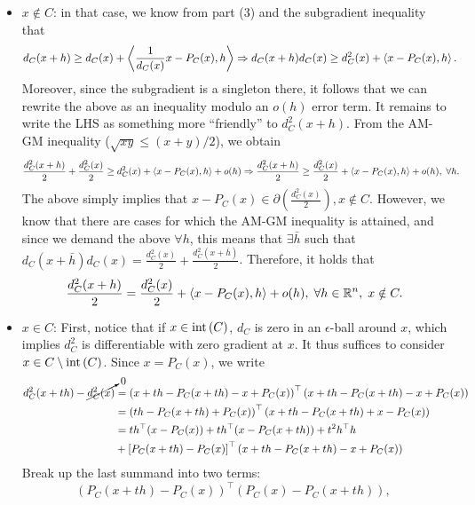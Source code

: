 \documentclass[10pt]{article}
\begin{document}
\begin{itemize}
\item $x \notin C$: in that case, we know from part (3) and the subgradient
inequality that
\begin{align*}
    d_C(x + h) &\geq d_C(x) + \left\langle \frac{1}{d_C(x)} x - P_C(x), h \right\rangle \Rightarrow
    d_C(x + h) d_C(x) \geq d^2_C(x) + \left\langle x - P_C(x), h \right\rangle.
\end{align*}
Moreover, since the subgradient is a singleton there, it follows that we
can rewrite the above as an inequality modulo an $o(h)$ error term.
It remains to write the LHS as something more ``friendly'' to $d_C^2(x + h)$.
From the AM-GM inequality ($\sqrt{xy} \leq (x + y)/2$), we obtain
\begin{align*}
    \frac{d^2_C(x + h)}{2} + \frac{d_C^2(x)}{2} &\geq d_C^2(x) +
    \left\langle x - P_C(x), h \right\rangle + o(h) \Rightarrow
    \frac{d_C^2(x + h)}{2} \geq \frac{d_C^2(x)}{2} + \left\langle x - P_C(x), h \right\rangle
    + o(h), \; \forall h.
\end{align*}
The above simply implies that $ x - P_C(x) \in \partial \left(
\frac{d_C^2(x)}{2} \right), x \notin C$. However, we know that there are cases
for which the AM-GM inequality is attained, and since we demand the above
$\forall h$, this means that $\exists \bar{h}$ such that $d_C(x+\bar{h}) d_C(x)
= \frac{d_C^2(x)}{2} + \frac{d_C^2(x + \bar{h})}{2}$. Therefore, it holds that
\[
    \frac{d_C^2(x + h)}{2} = \frac{d_C^2(x)}{2} + \left\langle x - P_C(x), h \right\rangle
    + o(h), \; \forall h \in \mathbb{R}^n, \; x \notin C.
\]
\item $x \in C$: First, notice that if $x \in \mathrm{int}\left( C \right)$, $d_C$ is zero in
an $\epsilon$-ball around $x$, which implies $d_C^2$ is differentiable
with zero gradient at $x$. It thus suffices to consider $x \in C \setminus
\mathrm{int}\left( C \right)$. Since $x = P_C(x)$, we write
\begin{align*}
    d_C^2(x + th) - \cancelto{0}{d_C^2(x)} &= \left( x + th - P_C(x + th)
        - x + P_C(x) \right)^\top \left(x + th - P_C(x + th) - x +
        P_C(x)\right)\\
      &= \left(th - P_C(x + th) + P_C(x)\right)^\top \left(x + th - P_C(x + th)
        +x - P_C(x) \right) \\
      &= t h^\top (x - P_C(x)) + th^\top (x - P_C(x + th)) + t^2 h^\top h \\
      &+ \left[ P_C(x + th) - P_C(x) \right]^\top \left(x + th - P_C(x + th)
         - x + P_C(x) \right)
\end{align*}
Break up the last summand into two terms:
\[
    (P_C(x + th) - P_C(x))^\top \left(P_C(x) - P_C(x + th)\right), \;
\]
\end{itemize}
\end{document}
